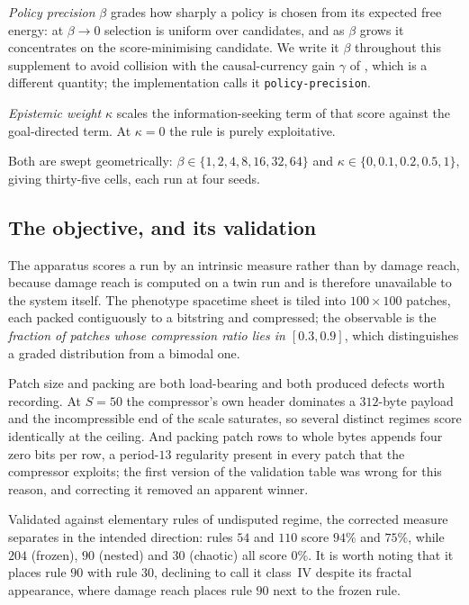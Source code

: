 \documentclass[man,12pt,floatsintext,donotrepeattitle]{apa7}
\newcommand{\secref}[1]{\emph{\nameref{#1}}}
\begin{document}
\emph{Policy precision} $\beta$ grades how sharply a policy is chosen from its
expected free energy: at $\beta \to 0$ selection is uniform over candidates, and
as $\beta$ grows it concentrates on the score-minimising candidate. We write it
$\beta$ throughout this supplement to avoid collision with the causal-currency
gain $\gamma$ of \secref{sec:gain}, which is a different quantity; the
implementation calls it \texttt{policy-precision}.

\emph{Epistemic weight} $\kappa$ scales the information-seeking term of that
score against the goal-directed term. At $\kappa = 0$ the rule is purely
exploitative.

Both are swept geometrically: $\beta \in \{1,2,4,8,16,32,64\}$ and
$\kappa \in \{0, 0.1, 0.2, 0.5, 1\}$, giving thirty-five cells, each run at four
seeds.

\subsection*{The objective, and its validation}

The apparatus scores a run by an intrinsic measure rather than by damage reach,
because damage reach is computed on a twin run and is therefore unavailable to
the system itself. The phenotype spacetime sheet is tiled into $100\times100$
patches, each packed contiguously to a bitstring and compressed; the observable
is the \emph{fraction of patches whose compression ratio lies in $[0.3,0.9]$},
which distinguishes a graded distribution from a bimodal one.

Patch size and packing are both load-bearing and both produced defects worth
recording. At $S=50$ the compressor's own header dominates a $312$-byte payload
and the incompressible end of the scale saturates, so several distinct regimes
score identically at the ceiling. And packing patch rows to whole bytes appends
four zero bits per row, a period-$13$ regularity present in every patch that the
compressor exploits; the first version of the validation table was wrong for
this reason, and correcting it removed an apparent winner.

Validated against elementary rules of undisputed regime, the corrected measure
separates in the intended direction: rules $54$ and $110$ score $94\%$ and
$75\%$, while $204$ (frozen), $90$ (nested) and $30$ (chaotic) all score $0\%$.
It is worth noting that it places rule $90$ with rule $30$, declining to call it
class~IV despite its fractal appearance, where damage reach places rule $90$
next to the frozen rule.
\end{document}
